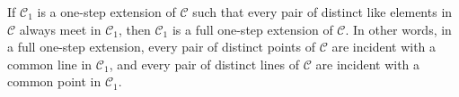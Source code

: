 If $\mathcal{C}_1$ is a one-step extension of $\mathcal{C}$ such that every pair of distinct like elements in $\mathcal{C}$ always meet in $\mathcal{C}_1$, then $\mathcal{C}_1$ is a full one-step extension of $\mathcal{C}$. In other words, in a full one-step extension, every pair of distinct points of $\mathcal{C}$ are incident with a common line in $\mathcal{C}_1$, and every pair of distinct lines of $\mathcal{C}$ are incident with a common point in $\mathcal{C}_1$.
